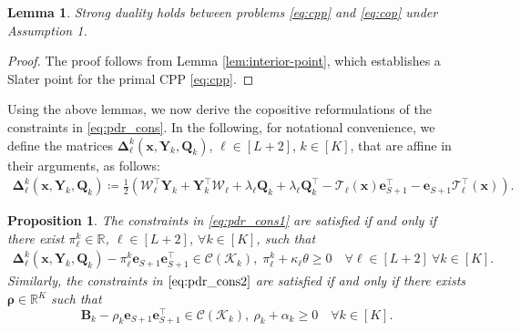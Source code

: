 \documentclass{article}
\newcommand{\RR}{\mathbb{R}}
\newtheorem{proposition}{Proposition}
\newtheorem{lemma}{Lemma}
\begin{document}
\begin{lemma} \label{lem3}
Strong duality holds between problems \eqref{eq:cpp} and \eqref{eq:cop} under Assumption 1.
\end{lemma}
\begin{proof}
The proof follows from Lemma \ref{lem:interior-point}, which establishes a Slater point for the primal CPP \eqref{eq:cpp}. 
\end{proof}
Using the above lemmas, we  now derive the copositive reformulations of the constraints in \eqref{eq:pdr_cons}. In the following, for notational convenience, we define the matrices $\bm \Delta^k_\ell(\bm x,\bm Y_k,\bm Q_k)$, $\ell \in [L+2]$, $k\in[K]$, that are affine in their arguments, as follows:
\begin{equation}
\label{eq:pldr_omega}
\begin{array}{clll}
\bm \Delta^k_\ell(\bm x,\bm Y_k,\bm Q_k) \coloneqq \frac{1}{2}\left ( \bm{\mathcal{W}}^\top_\ell \bm Y_k +\bm Y_k^\top \bm{\mathcal{W}}_\ell + \lambda_\ell \bm Q_k + \lambda_\ell \bm Q_k^\top - \bm{\mathcal{T}}_\ell(\bm x)\mathbf{e}_{S+1}^\top - \mathbf{e}_{S+1} \bm{\mathcal{T}}_\ell^\top(\bm x) \right ).
\end{array}
\end{equation}

\begin{proposition}
\label{prop:constraint_reformulation}
The constraints in \eqref{eq:pdr_cons1} are satisfied if and only if there exist $\pi^k_\ell \in \RR$, $\ell \in [L+2]$, $\forall k \in [K]$, such that
\begin{equation}
\label{eq:pdr_cons1_1}
\begin{array}{clll}
\bm \Delta^k_\ell(\bm x,\bm Y_k,\bm Q_k) - \pi^k_\ell \mathbf{e}_{S+1} \mathbf{e}_{S+1}^\top 
\in \mathcal{C} (\mathcal K_k), \; \pi^k_\ell + \kappa_\ell \theta \geq 0  \quad \forall \ell \in [L+2] \ \forall k \in [K].
\end{array}
\end{equation}
Similarly, the constraints in $\eqref{eq:pdr_cons2}$ are satisfied if and only if there exists $\bm \rho \in \RR^{K}$ such that 
\begin{equation}
\label{eq:pdr_cons2_1}
    \bm B_k - \rho_k \mathbf{e}_{S+1} \mathbf{e}_{S+1}^\top \in \mathcal{C} (\mathcal K_k), \ \rho_k + \alpha_k \geq 0 \quad \forall k \in [K].
\end{equation}
\end{proposition}
\end{document}
